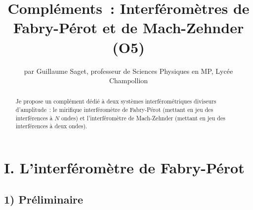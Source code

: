\documentclass{article}
\title{\huge{\textbf{Compléments : Interféromètres de Fabry-Pérot et de Mach-Zehnder (O5)}}}
\author{par Guillaume Saget, professeur de Sciences Physiques en MP, Lycée Champollion}
\date{}
\begin{document}
\maketitle


\begin{abstract}
Je propose un complément dédié à deux systèmes interférométriques
diviseurs d'amplitude : le mirifique interféromètre de Fabry-Pérot
(mettant en jeu des interférences à $N$ ondes) et l'interféromètre
de Mach-Zehnder (mettant en jeu des interférences à deux ondes).
\end{abstract}


\section*{I. L'interféromètre de Fabry-Pérot}
\subsection*{1) Préliminaire}
\end{document}
